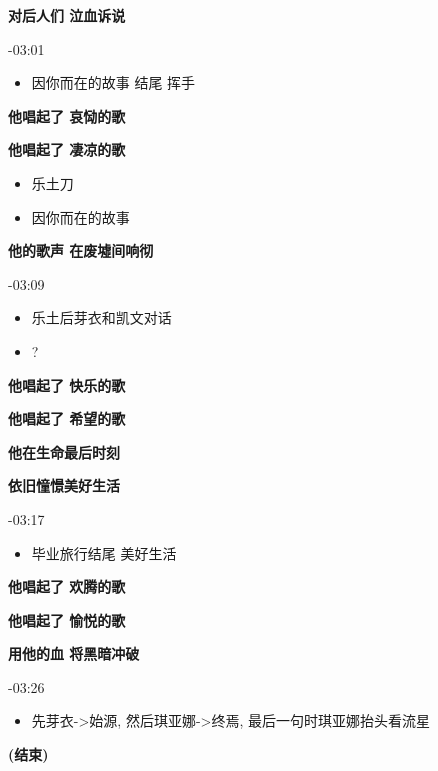 \documentclass[a4paper]{article}
\begin{document}
\textbf{对后人们 泣血诉说}

-03:01

\begin{itemize}
    \item 因你而在的故事 结尾 挥手
\end{itemize}

\textbf{他唱起了 哀恸的歌}

\textbf{他唱起了 凄凉的歌}

\begin{itemize}
    \item 乐土刀
    \item 因你而在的故事
\end{itemize}

\textbf{他的歌声 在废墟间响彻}

-03:09

\begin{itemize}
    \item 乐土后芽衣和凯文对话
    \item ?
\end{itemize}

\textbf{他唱起了 快乐的歌}

\textbf{他唱起了 希望的歌}

\textbf{他在生命最后时刻}

\textbf{依旧憧憬美好生活}

-03:17

\begin{itemize}
    \item 毕业旅行结尾 美好生活
\end{itemize}

\textbf{他唱起了 欢腾的歌}

\textbf{他唱起了 愉悦的歌}

\textbf{用他的血 将黑暗冲破}

-03:26

\begin{itemize}
    \item 先芽衣->始源, 然后琪亚娜->终焉, 最后一句时琪亚娜抬头看流星
\end{itemize}

\textbf{(结束)}
\end{document}
